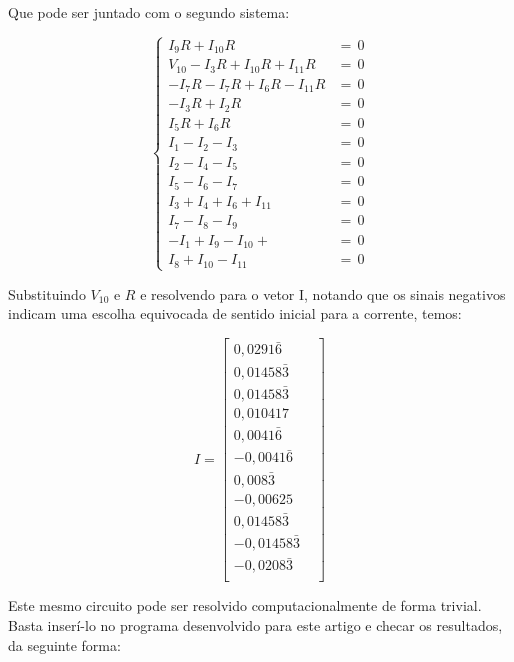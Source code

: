 \documentclass[twocolumn, 10pt,a4paper]{extarticle}
\begin{document}
Que pode ser juntado com o segundo sistema:

\[
\left\{
\begin{aligned}
    I_9R + I_{10}R &= \,0 \\ 
    V_{10} - I_3R + I_{10}R + I_{11}R &= \,0 \\ 
	-I_7R - I_7R + I_6R - I_{11}R &= \,0 \\
	- I_3R + I_2R &= \,0 \\ 
	I_5R + I_6R &= \,0 \\
	I_1 - I_2 - I_3 &= \, 0 \\
    I_2 - I_4 - I_5 &= \, 0 \\
    I_5 - I_6 - I_7 &= \, 0 \\
    I_3 + I_4 + I_6 + I_{11} &= \, 0 \\
    I_7 - I_8 - I_9 &= \, 0 \\
    - I_1 + I_9 - I_{10} + &= \, 0 \\
    I_8 + I_{10} - I_{11} &= \, 0 
\end{aligned}
\right.
\]

Substituindo $V_{10}$ e $R$ e resolvendo para o vetor I, notando que os sinais negativos indicam uma escolha equivocada de sentido inicial para a corrente, temos:

\[
I = 
\begin{bmatrix}
0,0291 \bar 6 & \\
0,01458 \bar 3  & \\
0,01458 \bar 3  & \\
0,010417  & \\
0,0041 \bar 6  & \\
-0,0041 \bar 6  & \\
0,008 \bar 3  & \\
-0,00625  & \\
0,01458\bar 3  & \\
-0,01458\bar 3  & \\
-0,0208\bar 3  & \\
\end{bmatrix}
\]

Este mesmo circuito pode ser resolvido computacionalmente de forma trivial. Basta inserí-lo no programa desenvolvido para este artigo e checar os resultados, da seguinte forma:
\end{document}
